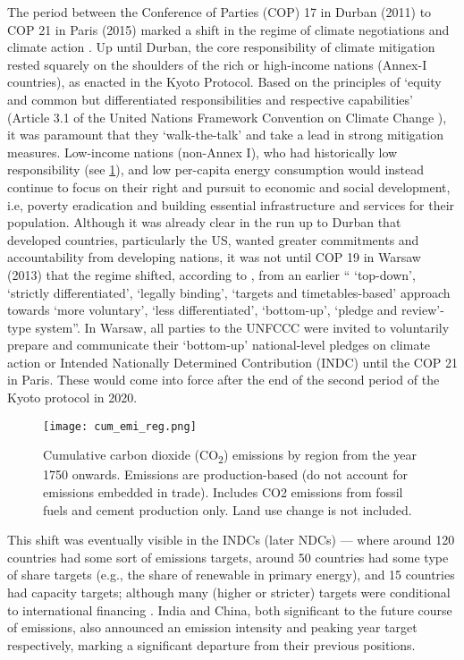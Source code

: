 \documentclass[../thesis.tex]{subfiles}
\begin{document}
The period between the Conference of Parties (COP) 17 in Durban (2011) to COP 21 in Paris (2015) marked a shift in the regime of climate negotiations and climate action \citep{sengupta2019}. Up until Durban, the core responsibility of climate mitigation rested squarely on the shoulders of the rich or high-income nations (Annex-I countries), as enacted in the Kyoto Protocol. Based on the principles of `equity and common but differentiated responsibilities and respective capabilities' (Article 3.1 of the United Nations Framework Convention on  Climate Change \citet{unfccc1992}), it was paramount that they `walk-the-talk' and take a lead in strong mitigation measures. Low-income nations (non-Annex I), who had historically low responsibility (see \cref{fig:hist_contb}), and low per-capita energy consumption would instead continue to focus on their right and pursuit to economic and social development, i.e, poverty eradication and building essential infrastructure and services for their population. Although it was already clear in the run up to Durban that developed countries, particularly the US, wanted greater commitments and accountability from developing nations, it was not until COP 19 in Warsaw (2013) that the regime shifted, according to \citet{sengupta2019}, from an earlier `` `top-down', `strictly differentiated', `legally binding', `targets and timetables-based' approach towards `more voluntary', `less differentiated', `bottom-up', `pledge and review'-type system''. In Warsaw, all parties to the UNFCCC were invited to voluntarily prepare and communicate their `bottom-up' national-level pledges on climate action or Intended Nationally Determined Contribution (INDC) until the COP 21 in Paris. These would come into force after the end of the second period of the Kyoto protocol in 2020.

\begin{figure}[h]
\centering
\texttt{[image: cum\_emi\_reg.png]}
\caption{Cumulative carbon dioxide (CO\textsubscript{2}) emissions by region from the year 1750 onwards. Emissions are production-based (do not account for emissions embedded in trade). Includes CO2 emissions from fossil fuels and cement production only. Land use change is not included.}
\label{fig:hist_contb}
\end{figure}

This shift was eventually visible in the INDCs (later NDCs) --- where around 120 countries had some sort of emissions targets, around 50 countries had some type of share targets (e.g., the share of renewable in primary energy), and 15 countries had capacity targets; although many (higher or stricter) targets were conditional to international financing \citep{rogelj2017}. India and China, both significant to the future course of emissions, also announced an emission intensity and peaking year target respectively, marking a significant departure from their previous positions. 
\end{document}
